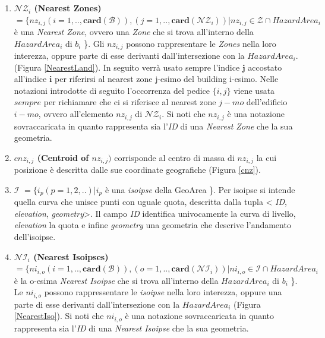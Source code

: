 \begin{enumerate}
	\item \textbf{$ \mathcal{NZ}_i $ (Nearest Zones)} $ = \{nz_{i,j}(i=1,..,\mathbf{card}( \mathcal{B} )), (j=1,..,\mathbf{card}(\mathcal{ NZ}_i)) | nz_{i,j} \in  \mathcal{Z}  \cap HazardArea_i $ è una \textit{Nearest Zone}, ovvero 	una \textit{Zone} che si trova all'interno della $HazardArea_i$ di $b_i$ \}. Gli $nz_{i,j}$ possono rappresentare le \textit{Zones} nella loro interezza, oppure parte di esse derivanti dall'intersezione con la $HazardArea_i$.  (Figura \ref{NearestLand}).
	In seguito verrà usato sempre l'indice $\mathbf{j}$ accostato all'indice $\mathbf{i}$ per riferirsi al nearest zone j-esimo del building i-esimo.
	Nelle notazioni introdotte di seguito l'occorrenza del pedice $\{i,j\}$ viene usata $sempre$ per richiamare che ci si riferisce al nearest zone $j-mo$ dell'edificio $i-mo$, ovvero all'elemento $nz_{i,j}$ di $ \mathcal{NZ}_i $.
	Si noti che $nz_{i,j}$ è una notazione sovraccaricata in quanto rappresenta sia l’\textit{ID} di una \textit{Nearest Zone} che la sua geometria.
	
	\item \textbf{$ cnz_{i,j} $ (Centroid of $nz_{i,j})$} corrisponde al centro di massa di $nz_{i,j}$ la cui posizione è descritta dalle sue coordinate geografiche (Figura \ref{cnz}). 
	
	\item \textbf{$ \mathcal{I} $} $ = \{i_p(p=1,2,..) | i_p $ \`e una \textit{isoipse} della GeoArea \}. Per isoipse si intende quella curva che unisce punti con uguale quota, descritta dalla tupla < \textit{ID}, \textit{elevation}, \textit{geometry}>. Il campo \textit{ID} identifica univocamente la curva di livello, \textit{elevation} la quota  e infine \textit{geometry} una geometria che descrive l'andamento dell'isoipse.
	
	\item \textbf{$ \mathcal{NI}_i $ (Nearest Isoipses)} $ = \{ ni_{i,o}(i=1,..,\mathbf{card}( \mathcal{B} )), (o=1,. . ,\mathbf{card}(\mathcal{ NI}_i)) | ni_{i,o} \in  \mathcal{I}  \cap HazardArea_i$ è la o-esima \textit{Nearest Isoipse} che si trova all'interno della $HazardArea_i$ di $b_i$ \}. Le $ni_{i,o}$ possono rappressentare le \textit{isoipse} nella loro interezza, oppure una parte di esse derivanti dall'intersezione con la $HazardArea_i$  (Figura \ref{NearestIso}). Si noti che $ni_{i,o}$ è una notazione sovraccaricata in quanto rappresenta sia l’\textit{ID} di una \textit{Nearest Isoipse} che la sua geometria.
	

\end{enumerate}
